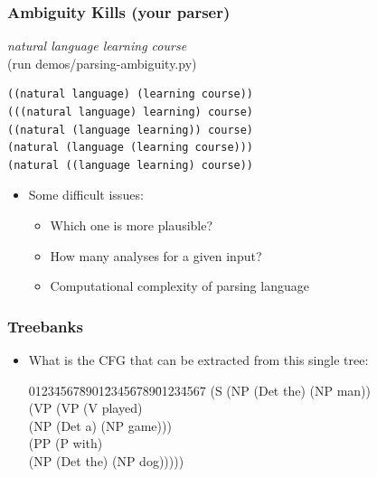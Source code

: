 \begin{frame}[fragile]
\frametitle{Ambiguity Kills (your parser)}
{\em natural language learning course} \\
(run demos/parsing-ambiguity.py)
\begin{verbatim}
((natural language) (learning course))
(((natural language) learning) course)
((natural (language learning)) course)
(natural (language (learning course)))
(natural ((language learning) course))
\end{verbatim}
\begin{itemize}
\item Some difficult issues:
\begin{itemize}
\item Which one is more plausible?
\item How many analyses for a given input? 
\item Computational complexity of parsing language
\end{itemize}
\end{itemize}
\end{frame}

\begin{frame}
\frametitle{Treebanks}
\begin{itemize}
\item What is the CFG that can be extracted from this single tree: 
\begin{tabbing}
0123\=4567\=8901\=2345\=6789\=0123\=4567 \kill
(S \>(NP (Det the) (NP man)) \\
\> (VP \> (VP \> (V played) \\
\> \> \> (NP (Det a) (NP game))) \\
\> \> (PP \>(P with) \\
\> \> \> (NP (Det the) (NP dog)))))
\end{tabbing}
\end{itemize}
\end{frame}

